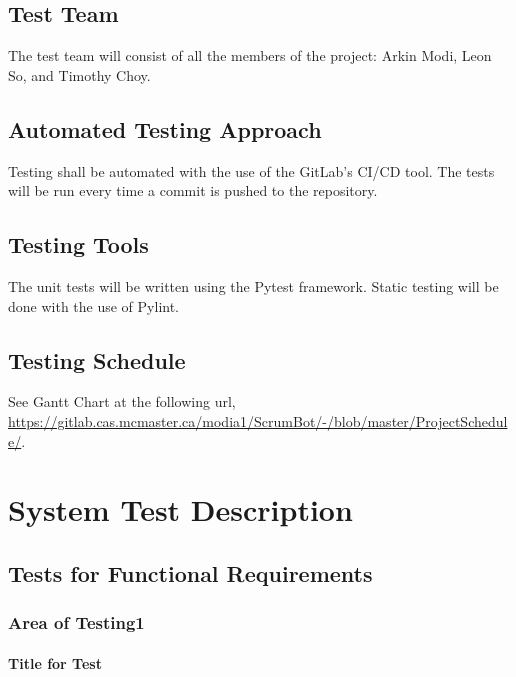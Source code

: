 \documentclass[12pt, titlepage]{article}
\begin{document}
\subsection{Test Team}
The test team will consist of all the members of the project: Arkin Modi, Leon So, and Timothy Choy.

\subsection{Automated Testing Approach}
Testing shall be automated with the use of the GitLab's CI/CD tool. The tests will be run every time a commit is pushed to the repository.

\subsection{Testing Tools}
The unit tests will be written using the Pytest framework. Static testing will be done with the use of Pylint.

\subsection{Testing Schedule}
See Gantt Chart at the following url, \url{https://gitlab.cas.mcmaster.ca/modia1/ScrumBot/-/blob/master/ProjectSchedule/}.

\section{System Test Description}
    
\subsection{Tests for Functional Requirements}

\subsubsection{Area of Testing1}
        
\paragraph{Title for Test}
\end{document}
